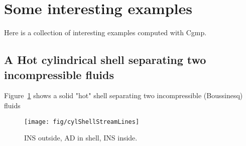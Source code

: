 \section{Some interesting examples}

Here is a collection of interesting examples computed with Cgmp.

\subsection{A Hot cylindrical shell separating two incompressible fluids}

Figure~\ref{fig:cylShell} shows a solid "hot" shell separating two incompressible (Boussinesq) fluids
\begin{figure}
\begin{center}
  \texttt{[image: fig/cylShellStreamLines]}
\end{center}
\caption{INS outside, AD in shell, INS inside.}
\label{fig:cylShell}
\end{figure}


% 
% 
% 



